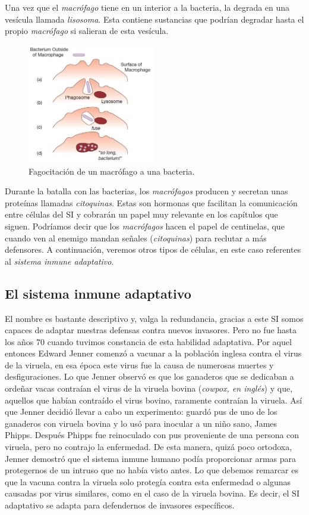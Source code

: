 Una vez que el \textit{macrófago} tiene en un interior a la bacteria, la degrada en una vesícula llamada \textit{lisosoma}. Esta contiene sustancias que podrían degradar hasta el propio \textit{macrófago} si salieran de esta vesícula. 


\begin{figure}[t]
	\centering
	\includegraphics[width=0.5\textwidth]{1_macrofago}
	\caption{Fagocitación de un macrófago a una bacteria.}
	\label{fig:macrofago}
\end{figure}


Durante la batalla con las bacterias, los \textit{macrófagos} producen y secretan unas proteínas llamadas \textit{citoquinas}.
Estas son hormonas que facilitan la comunicación entre células del SI y cobrarán un papel muy relevante en los capítulos que siguen.
Podríamos decir que los \textit{macrófagos} hacen el papel de centinelas, que cuando ven al enemigo mandan señales (\textit{citoquinas}) para reclutar a más defensores. A continuación, veremos otros tipos de células, en este caso referentes al \textit{sistema inmune adaptativo}.

\subsection{El sistema inmune adaptativo}

El nombre es bastante descriptivo y, valga la redundancia, gracias a este SI somos capaces de adaptar nuestras defensas contra nuevos invasores. Pero no fue hasta los años 70 cuando tuvimos constancia de esta habilidad adaptativa. Por aquel entonces Edward Jenner comenzó a vacunar a la población inglesa contra el virus de la viruela, en esa época este virus fue la causa de numerosas muertes y desfiguraciones. Lo que Jenner observó es que los ganaderos que se dedicaban a ordeñar vacas contraían el virus de la viruela bovina (\textit{cowpox, en inglés}) y que, aquellos  que habían contraído el virus bovino, raramente contraían la viruela. Así que Jenner decidió llevar a cabo un experimento: guardó pus de uno de los ganaderos con viruela bovina y lo usó para inocular a un niño sano, James Phipps. Después Phipps fue reinoculado con pus proveniente de una persona con viruela, pero no contrajo la enfermedad. De esta manera, quizá poco ortodoxa, Jenner demostró que el sistema inmune humano podía proporcionar armas para protegernos de un intruso que no había visto antes. Lo que debemos remarcar es que la vacuna contra la viruela solo protegía contra esta enfermedad o algunas causadas por virus similares, como en el caso de la viruela bovina. Es decir, el SI adaptativo se adapta para defendernos de invasores específicos. 

